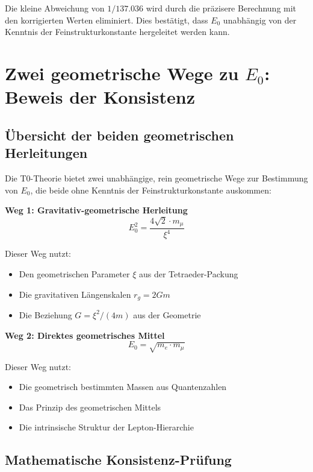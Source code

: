\documentclass[12pt,a4paper]{article}
\theoremstyle{definition}
\begin{document}
	Die kleine Abweichung von $1/137.036$ wird durch die pr\"azisere Berechnung mit den korrigierten Werten eliminiert. Dies best\"atigt, dass $E_0$ unabh\"angig von der Kenntnis der Feinstrukturkonstante hergeleitet werden kann.
	
	\section{Zwei geometrische Wege zu $E_0$: Beweis der Konsistenz}
	
	\subsection{\"Ubersicht der beiden geometrischen Herleitungen}
	
	Die T0-Theorie bietet zwei unabh\"angige, rein geometrische Wege zur Bestimmung von $E_0$, die beide ohne Kenntnis der Feinstrukturkonstante auskommen:
	
	\textbf{Weg 1: Gravitativ-geometrische Herleitung}
	\begin{equation}
		E_0^2 = \frac{4\sqrt{2} \cdot m_\mu}{\xi^4}
	\end{equation}
	
	Dieser Weg nutzt:
	\begin{itemize}
		\item Den geometrischen Parameter $\xi$ aus der Tetraeder-Packung
		\item Die gravitativen L\"angenskalen $r_g = 2Gm$
		\item Die Beziehung $G = \xi^2/(4m)$ aus der Geometrie
	\end{itemize}
	
	\textbf{Weg 2: Direktes geometrisches Mittel}
	\begin{equation}
		E_0 = \sqrt{m_e \cdot m_\mu}
	\end{equation}
	
	Dieser Weg nutzt:
	\begin{itemize}
		\item Die geometrisch bestimmten Massen aus Quantenzahlen
		\item Das Prinzip des geometrischen Mittels
		\item Die intrinsische Struktur der Lepton-Hierarchie
	\end{itemize}
	
	\subsection{Mathematische Konsistenz-Pr\"ufung}
	
\end{document}
